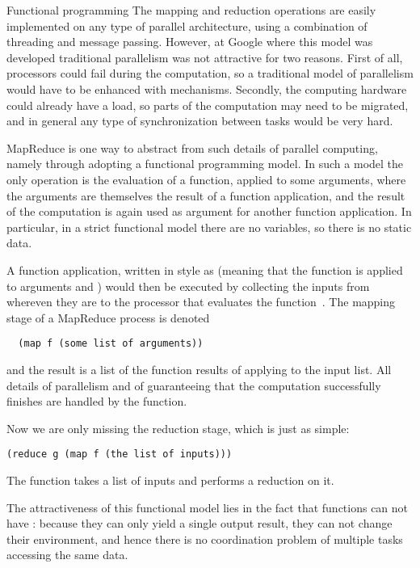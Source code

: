  {Functional programming}
%
The mapping and reduction operations are easily implemented on any
type of parallel architecture, using a combination of threading and
message passing. However, at Google where this model was developed
traditional parallelism was not attractive for two reasons. First of
all, processors could fail during the computation, so a traditional
model of parallelism would have to be enhanced with  mechanisms. Secondly, the computing hardware could
already have a load, so parts of the computation may need to be
migrated, and in general any type of synchronization between tasks
would be very hard.

MapReduce is one way to abstract from such details of parallel
computing, namely through adopting a functional programming model. In
such a model the only operation is the evaluation of a function,
applied to some arguments, where the arguments are themselves the
result of a function application, and the result of the computation is
again used as argument for another function application. In
particular, in a strict functional model there are no variables, so
there is no static data.

A function application, written in  style as  (meaning that the function  is applied to arguments 
and ) would then be executed by collecting the inputs from
whereven they are to the processor that evaluates the
function~. The mapping stage of a MapReduce process is denoted
\begin{verbatim}
  (map f (some list of arguments))
\end{verbatim}
and the result is a list of the function results of applying  to
the input list. All details of parallelism and of guaranteeing that
the computation successfully finishes are handled by the 
function.

Now we are only missing the reduction stage, which is just as simple:
\begin{verbatim}
(reduce g (map f (the list of inputs)))
\end{verbatim}
The  function takes a list of inputs and performs a
reduction on it.

The attractiveness of this functional model lies in the fact that
functions can not have : because they can only
yield a single output result, they can not change
their environment, and hence there is no coordination problem of
multiple tasks accessing the same data. 

